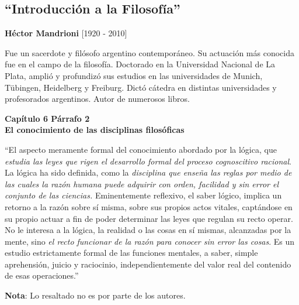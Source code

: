 \documentclass{article}
\begin{document}
\subsection{``Introducción a la Filosofía''}
    
    \begin{center}
        \large{\textbf{Héctor Mandrioni} [1920 - 2010]}
    \end{center}
    
    Fue un sacerdote y filósofo argentino contemporáneo. Su actuación más conocida fue en el campo de la filosofía. Doctorado en la Universidad Nacional de La Plata, amplió y profundizó sus estudios en las universidades de Munich, Tübingen, Heidelberg y Freiburg. Dictó cátedra en distintas universidades y profesorados argentinos. Autor de numerosos libros. \par
    
    \begin{center}
        \large{\textbf{Capítulo 6 Párrafo 2 \\
        El conocimiento de las disciplinas filosóficas }}
    \end{center}
    
    ``El aspecto meramente formal del conocimiento abordado por la lógica, que \emph{estudia las leyes que rigen el desarrollo formal del proceso cognoscitivo racional}. La lógica ha sido definida, como la \emph{disciplina que enseña las reglas por medio de las cuales la razón humana puede adquirir con orden, facilidad y sin error el conjunto de las ciencias.} Eminentemente reflexivo, el saber lógico, implica un retorno a la razón sobre sí misma, sobre sus propios actos vitales, captándose en su propio actuar a fin de poder determinar las leyes que regulan su recto operar. No le interesa a la lógica, la realidad o las cosas en sí mismas, alcanzadas por la mente, sino \emph{el recto funcionar de la razón para conocer sin error las cosas}. Es un estudio estrictamente formal de las funciones mentales, a saber, simple aprehensión, juicio y raciocinio, independientemente del valor real del contenido de esas operaciones.'' \par
    
    
    \textbf{Nota}: Lo resaltado no es por parte de los autores. \par

\vspace*{\fill}
    
\end{document}
